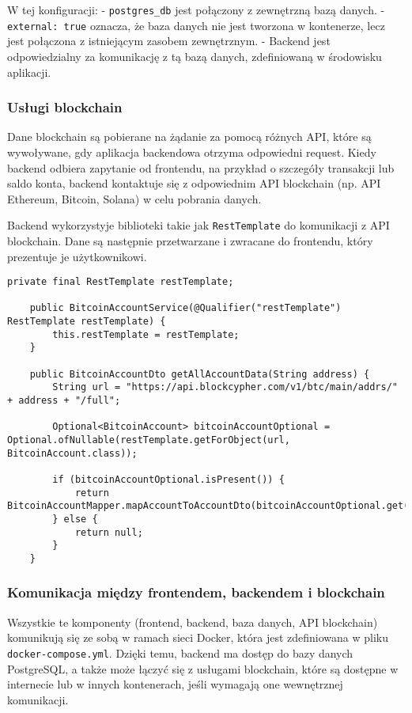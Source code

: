 W tej konfiguracji:
- \texttt{postgres\_db} jest połączony z zewnętrzną bazą danych.
- \texttt{external: true} oznacza, że baza danych nie jest tworzona w kontenerze, lecz jest połączona z istniejącym zasobem zewnętrznym.
- Backend jest odpowiedzialny za komunikację z tą bazą danych, zdefiniowaną w środowisku aplikacji.

\subsubsection{Usługi blockchain}

Dane blockchain są pobierane na żądanie za pomocą różnych API, które są wywoływane, gdy aplikacja backendowa otrzyma odpowiedni request. Kiedy backend odbiera zapytanie od frontendu, na przykład o szczegóły transakcji lub saldo konta, backend kontaktuje się z odpowiednim API blockchain (np. API Ethereum, Bitcoin, Solana) w celu pobrania danych.

Backend wykorzystyje biblioteki takie jak \texttt{RestTemplate} do komunikacji z API blockchain. Dane są następnie przetwarzane i zwracane do frontendu, który prezentuje je użytkownikowi.

\begin{verbatim}
private final RestTemplate restTemplate;

    public BitcoinAccountService(@Qualifier("restTemplate") RestTemplate restTemplate) {
        this.restTemplate = restTemplate;
    }

    public BitcoinAccountDto getAllAccountData(String address) {
        String url = "https://api.blockcypher.com/v1/btc/main/addrs/" + address + "/full";

        Optional<BitcoinAccount> bitcoinAccountOptional = Optional.ofNullable(restTemplate.getForObject(url, BitcoinAccount.class));

        if (bitcoinAccountOptional.isPresent()) {
            return BitcoinAccountMapper.mapAccountToAccountDto(bitcoinAccountOptional.get());
        } else {
            return null;
        }
    }
\end{verbatim}

\subsubsection{Komunikacja między frontendem, backendem i blockchain}

Wszystkie te komponenty (frontend, backend, baza danych, API blockchain) komunikują się ze sobą w ramach sieci Docker, która jest zdefiniowana w pliku \texttt{docker-compose.yml}. Dzięki temu, backend ma dostęp do bazy danych PostgreSQL, a także może łączyć się z usługami blockchain, które są dostępne w internecie lub w innych kontenerach, jeśli wymagają one wewnętrznej komunikacji.